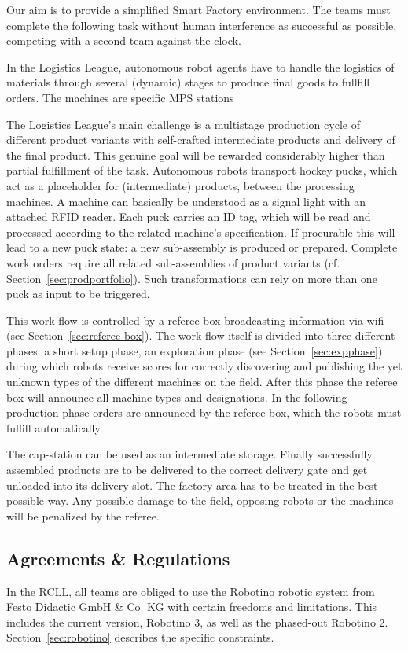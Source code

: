 \documentclass[12pt,twoside]{article}
\newcommand{\refsec}[1]{Section~\ref{#1}}
\begin{document}
Our aim is to provide a simplified Smart Factory environment. The
teams must complete the following task without human interference as
successful as possible, competing with a second team against the
clock.

In the Logistics League, autonomous robot agents have to handle the
logistics of materials through several (dynamic) stages to produce
final goods to fullfill orders. The machines are specific MPS stations

 The Logistics League's main challenge
is a multistage production cycle of different product variants with
self-crafted intermediate products and delivery of the final
product. This genuine goal will be rewarded considerably higher than
partial fulfillment of the task.  Autonomous robots transport hockey
pucks, which act as a placeholder for (intermediate) products, between
the processing machines. A machine can basically be understood as a
signal light with an attached RFID reader. Each puck carries an ID
tag, which will be read and processed according to the related
machine's specification. If procurable this will lead to a new puck
state: a new sub-assembly is produced or prepared. Complete work
orders require all related sub-assemblies of product variants (cf.
\refsec{sec:prodportfolio}). Such transformations can rely on more
than one puck as input to be triggered.

This work flow is controlled by a referee box broadcasting information
via wifi (see \refsec{sec:referee-box}). The work flow itself is
divided into three different phases: a short setup phase, an
exploration phase (see \refsec{sec:expphase}) during which robots
receive scores for correctly discovering and publishing the yet
unknown types of the different machines on the field. After this phase
the referee box will announce all machine types and designations. In
the following production phase orders are announced by the referee
box, which the robots must fulfill automatically.

The cap-station can be used as an intermediate storage. Finally
successfully assembled products are to be delivered to the correct
delivery gate and get unloaded into its delivery slot. The factory
area has to be treated in the best possible way. Any possible damage
to the field, opposing robots or the machines will be penalized by the
referee.

\subsection{Agreements \& Regulations}
\label{sec:agreements}
In the RCLL, all teams are obliged to use the Robotino robotic system
from Festo Didactic GmbH \& Co. KG with certain freedoms and
limitations. This includes the current version, Robotino 3, as well as
the phased-out Robotino 2. \refsec{sec:robotino} describes the
specific constraints.
\end{document}
